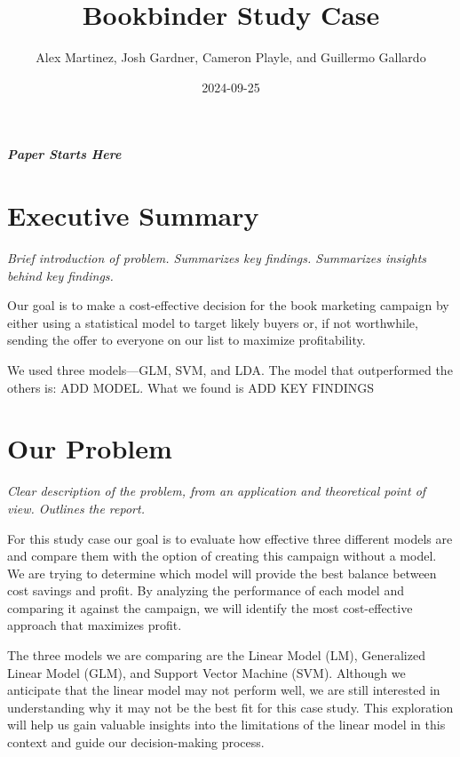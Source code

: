 \documentclass[
]{article}
\title{Bookbinder Study Case}
\author{Alex Martinez, Josh Gardner, Cameron Playle, and Guillermo
Gallardo}
\date{2024-09-25}
\begin{document}
\maketitle

\hypertarget{paper-starts-here}{%
\subparagraph{\texorpdfstring{\textbf{Paper Starts
Here}}{Paper Starts Here}}\label{paper-starts-here}}

\hypertarget{executive-summary}{%
\section{Executive Summary}\label{executive-summary}}

\emph{Brief introduction of problem. Summarizes key findings. Summarizes
insights behind key findings.}

Our goal is to make a cost-effective decision for the book marketing
campaign by either using a statistical model to target likely buyers or,
if not worthwhile, sending the offer to everyone on our list to maximize
profitability.

We used three models---GLM, SVM, and LDA. The model that outperformed
the others is: ADD MODEL. What we found is ADD KEY FINDINGS

\hypertarget{our-problem}{%
\section{Our Problem}\label{our-problem}}

\emph{Clear description of the problem, from an application and
theoretical point of view. Outlines the report.}

For this study case our goal is to evaluate how effective three
different models are and compare them with the option of creating this
campaign without a model. We are trying to determine which model will
provide the best balance between cost savings and profit. By analyzing
the performance of each model and comparing it against the campaign, we
will identify the most cost-effective approach that maximizes profit.

The three models we are comparing are the Linear Model (LM), Generalized
Linear Model (GLM), and Support Vector Machine (SVM). Although we
anticipate that the linear model may not perform well, we are still
interested in understanding why it may not be the best fit for this case
study. This exploration will help us gain valuable insights into the
limitations of the linear model in this context and guide our
decision-making process.
\end{document}
